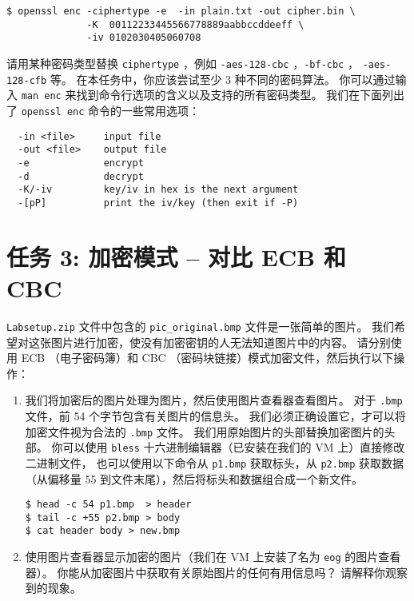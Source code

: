 \begin{lstlisting}
$ openssl enc -ciphertype -e  -in plain.txt -out cipher.bin \
              -K  00112233445566778889aabbccddeeff \
              -iv 0102030405060708
\end{lstlisting}

请用某种密码类型替换 {\tt ciphertype} ，例如 {\tt -aes-128-cbc} ，{\tt -bf-cbc} ，
{\tt -aes-128-cfb} 等。
在本任务中，你应该尝试至少 3 种不同的密码算法。
你可以通过输入 {\tt man enc} 来找到命令行选项的含义以及支持的所有密码类型。
我们在下面列出了 {\tt openssl enc} 命令的一些常用选项：

\begin{lstlisting}
  -in <file>     input file
  -out <file>    output file
  -e             encrypt
  -d             decrypt
  -K/-iv         key/iv in hex is the next argument
  -[pP]          print the iv/key (then exit if -P)
\end{lstlisting}




\section{任务 3: 加密模式 -- 对比 ECB 和 CBC}

\texttt{Labsetup.zip} 文件中包含的 {\tt pic\_original.bmp} 文件是一张简单的图片。
我们希望对这张图片进行加密，使没有加密密钥的人无法知道图片中的内容。
请分别使用 ECB （电子密码簿）和 CBC （密码块链接）模式加密文件，然后执行以下操作：

\begin{enumerate}
\item 我们将加密后的图片处理为图片，然后使用图片查看器查看图片。
对于 {\tt .bmp} 文件，前 54 个字节包含有关图片的信息头。
我们必须正确设置它，才可以将加密文件视为合法的 {\tt .bmp} 文件。
我们用原始图片的头部替换加密图片的头部。
你可以使用 \texttt{bless} 十六进制编辑器（已安装在我们的 VM 上）直接修改二进制文件，
也可以使用以下命令从 \texttt{p1.bmp} 获取标头，从 \texttt{p2.bmp} 获取数据
（从偏移量 55 到文件末尾），然后将标头和数据组合成一个新文件。

\begin{lstlisting}
$ head -c 54 p1.bmp  > header
$ tail -c +55 p2.bmp > body
$ cat header body > new.bmp
\end{lstlisting}


\item 使用图片查看器显示加密的图片（我们在 VM 上安装了名为 \texttt{eog} 的图片查看器）。
你能从加密图片中获取有关原始图片的任何有用信息吗？
请解释你观察到的现象。

\end{enumerate}

